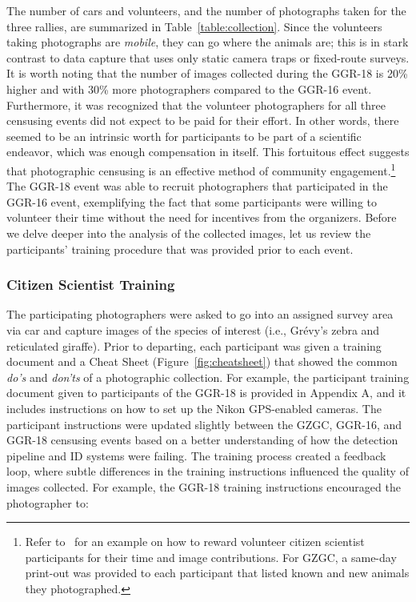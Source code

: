 The number of cars and volunteers, and the number of photographs taken for the three rallies, are summarized in Table~\ref{table:collection}.  Since the volunteers taking photographs are \textit{mobile}, they can go where the animals are; this is in stark contrast to data capture that uses only static camera traps or fixed-route surveys.  It is worth noting that the number of images collected during the GGR-18 is 20\% higher and with 30\% more photographers compared to the GGR-16 event.  Furthermore, it was recognized that the volunteer photographers for all three censusing events did not expect to be paid for their effort.  In other words, there seemed to be an intrinsic worth for participants to be part of a scientific endeavor, which was enough compensation in itself.  This fortuitous effect suggests that photographic censusing is an effective method of community engagement.\footnote{Refer to~\cite{parham_photographic_2015} for an example on how to reward volunteer citizen scientist participants for their time and image contributions.  For GZGC, a same-day print-out was provided to each participant that listed known and new animals they photographed.}  The GGR-18 event was able to recruit photographers that participated in the GGR-16 event, exemplifying the fact that some participants were willing to volunteer their time without the need for incentives from the organizers.  Before we delve deeper into the analysis of the collected images, let us review the participants' training procedure that was provided prior to each event.

\subsubsection{Citizen Scientist Training}

The participating photographers were asked to go into an assigned survey area via car and capture images of the species of interest (i.e., Gr\'evy's zebra and reticulated giraffe).  Prior to departing, each participant was given a training document and a Cheat Sheet (Figure~\ref{fig:cheatsheet}) that showed the common \textit{do's} and \textit{don'ts} of a photographic collection.  For example, the participant training document given to participants of the GGR-18 is provided in Appendix A, and it includes instructions on how to set up the Nikon GPS-enabled cameras.  The participant instructions were updated slightly between the GZGC, GGR-16, and GGR-18 censusing events based on a better understanding of how the detection pipeline and ID systems were failing.  The training process created a feedback loop, where subtle differences in the training instructions influenced the quality of images collected.  For example, the GGR-18 training instructions encouraged the photographer to:

